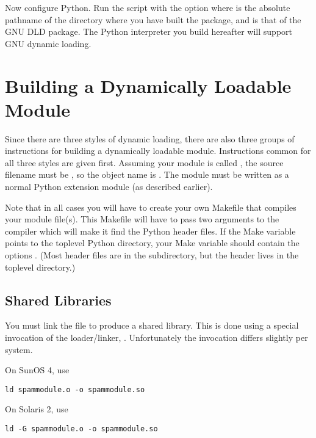 \documentclass{manual}
\begin{document}
Now configure Python.  Run the  script with the option
 where
 is the absolute pathname of the directory where you
have built the  package, and  is that
of the GNU DLD package.  The Python interpreter you build hereafter
will support GNU dynamic loading.


\section{Building a Dynamically Loadable Module}
\label{makedynload}

Since there are three styles of dynamic loading, there are also three
groups of instructions for building a dynamically loadable module.
Instructions common for all three styles are given first.  Assuming
your module is called , the source filename must be
, so the object name is .  The
module must be written as a normal Python extension module (as
described earlier).

Note that in all cases you will have to create your own Makefile that
compiles your module file(s).  This Makefile will have to pass two
 arguments to the \C{} compiler which will make it find the
Python header files.  If the Make variable  points to
the toplevel Python directory, your  Make variable should
contain the options .
(Most header files are in the  subdirectory, but the
 header lives in the toplevel directory.)


\subsection{Shared Libraries}
\label{linking}

You must link the  file to produce a shared library.  This is 
done using a special invocation of the \UNIX{} loader/linker,
.  Unfortunately the invocation differs slightly per
system.

On SunOS 4, use
\begin{verbatim}
ld spammodule.o -o spammodule.so
\end{verbatim}

On Solaris 2, use
\begin{verbatim}
ld -G spammodule.o -o spammodule.so
\end{verbatim}
\end{document}
